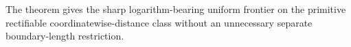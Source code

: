 The theorem gives the sharp logarithm-bearing uniform frontier on the primitive rectifiable coordinatewise-distance class without an unnecessary separate boundary-length restriction.